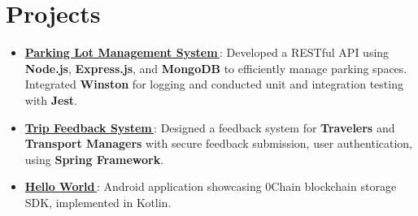 \documentclass[letterpaper,1pt]{article}
\let\orighref\href
\renewcommand{\href}[2]{\orighref{#1}{#2\,\faExternalLink}}
\begin{document}
\section{Projects}
\begin{itemize}[leftmargin=*, itemsep=1pt, parsep=0pt]

  \item \href{https://github.com/yash10019coder/ParkingLotBackend}{\textbf{Parking Lot Management System}}: Developed a RESTful API using \textbf{Node.js}, \textbf{Express.js}, and \textbf{MongoDB} to efficiently manage parking spaces. Integrated \textbf{Winston} for logging and conducted unit and integration testing with \textbf{Jest}.
  \item \href{https://github.com/yash10019coder/TravelSpringBoot}{\textbf{Trip Feedback System}}: Designed a feedback system for \textbf{Travelers} and \textbf{Transport Managers} with secure feedback submission, user authentication, using \textbf{Spring Framework}.
  \item \href{https://github.com/0chain/HelloWorld-Android}{\textbf{Hello World}}: Android application showcasing 0Chain blockchain storage SDK, implemented in Kotlin.

\end{itemize}
\end{document}
